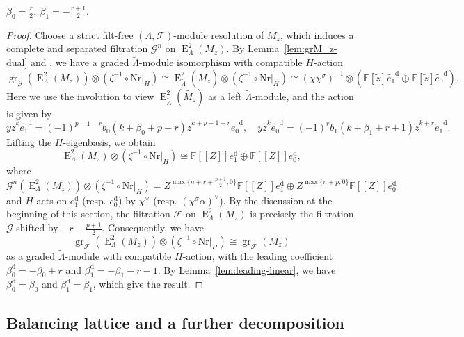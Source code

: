 \documentclass[11pt,a4paper]{article} %
\def\FF{\mathbb{F}}
\def\cF{\mathcal{F}}
\def\cG{\mathcal{G}}
\def\d{\operatorname{d}}
\def\E{\operatorname{E}}
\def\gr{\operatorname{gr}}
\def\max{\operatorname{max}}
\begin{document}
\begin{proposition}\label{prop:leading-coefficient}
    $\beta_0=\frac{r}{2},~\beta_1=-\frac{r+1}{2}$.
\end{proposition}

\begin{proof}
    Choose a strict filt-free $(\Lambda,\cF)$-module resolution of $M_z$, which induces a complete and separated filtration $\cG^n$ on $\E_\Lambda^2(M_z)$. By Lemma~\ref{lem:grM_z-dual} and \cite[Proposition 3.3.4.6]{BHHMS2}, we have a graded $\widetilde{\Lambda}$-module isomorphism with compatible $H$-action
    \[
    \gr_\cG\left(\E_\Lambda^2(M_z)\right)\otimes(\zeta^{-1}\circ\mathrm{Nr}|_H)\cong\E^2_{\widetilde{\Lambda}}(\widetilde{M_z})\otimes(\zeta^{-1}\circ\mathrm{Nr}|_H)\cong(\chi\chi^\sigma)^{-1}\otimes(\FF[\widetilde{z}]\widetilde{e_1}^{\d}\oplus\FF[\widetilde{z}]\widetilde{e_0}^{\d}).
    \]
    Here we use the involution to view $\E^2_{\widetilde{\Lambda}}(\widetilde{M_z})$ as a left $\widetilde{\Lambda}$-module, and the action is given by 
    \[
    \widetilde{y}\widetilde{z}^k\widetilde{e_1}^{\d}=(-1)^{p-1-r}b_0(k+\beta_0+p-r)\widetilde{z}^{k+p-1-r}\widetilde{e_0}^{\d},\quad\widetilde{y}\widetilde{z}^k\widetilde{e_0}^{\d}=(-1)^rb_1(k+\beta_1+r+1)\widetilde{z}^{k+r}\widetilde{e_1}^{\d}.
    \]
    Lifting the $H$-eigenbasis, we obtain 
    \[
    \E^2_{\Lambda}(M_z)\otimes(\zeta^{-1}\circ\mathrm{Nr}|_H)\cong\FF[[Z]]e_1^{\d}\oplus\FF[[Z]]e_0^{\d},
    \]
    where
    \[
    \cG^n\left(\E_\Lambda^2(M_z)\right)\otimes(\zeta^{-1}\circ\mathrm{Nr}|_H)=Z^{\max\{n+r+\frac{p+1}{2},0\}}\FF[[Z]]e_1^{\d}\oplus Z^{\max\{n+p,0\}}\FF[[Z]]e_0^{\d}
    \]
    and $H$ acts on $e_1^{\d}$ (resp. $e_0^{\d}$) by $\chi^\vee$ (resp. $(\chi^\sigma\alpha)^\vee$). By the discussion at the beginning of this section, the filtration $\cF$ on $\E_\Lambda^2(M_z)$ is precisely the filtration $\cG$ shifted by $-r-\frac{p+1}{2}$. Consequently, we have 
    \[
    \gr_{\cF}\left(\E_\Lambda^2(M_z)\right)\otimes(\zeta^{-1}\circ\mathrm{Nr}|_H)\cong\gr_{\cF}(M_z)
    \]
    as a graded $\widetilde{\Lambda}$-module with compatible $H$-action, with the leading coefficient $\beta_0^{\d}=-\beta_0+r$ and $\beta_1^{\d}=-\beta_1-r-1$. By Lemma~\ref{lem:leading-linear}, we have $\beta_0^{\d}=\beta_0$ and $\beta_1^{\d}=\beta_1$, which give the result.
\end{proof}

\subsection{Balancing lattice and a further decomposition}
\end{document}
